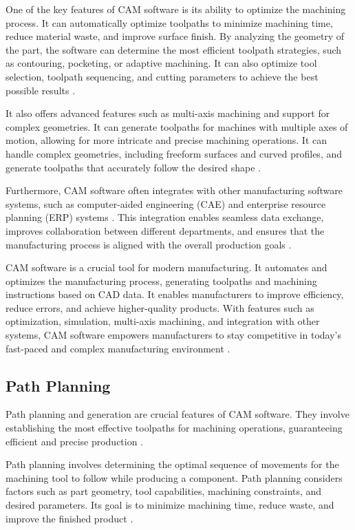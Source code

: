 One of the key features of CAM software is its ability to optimize the machining process. It can automatically optimize toolpaths to minimize machining time, reduce material waste, and improve surface finish. By analyzing the geometry of the part, the software can determine the most efficient toolpath strategies, such as contouring, pocketing, or adaptive machining. It can also optimize tool selection, toolpath sequencing, and cutting parameters to achieve the best possible results \cite{Kyratsis.2020}.

It also offers advanced features such as multi-axis machining and support for complex geometries. It can generate toolpaths for machines with multiple axes of motion, allowing for more intricate and precise machining operations. It can handle complex geometries, including freeform surfaces and curved profiles, and generate toolpaths that accurately follow the desired shape \cite{Liang.2021}.

Furthermore, CAM software often integrates with other manufacturing software systems, such as computer-aided engineering (CAE) and enterprise resource planning (ERP) systems \cite{Ramazanov.2020}. This integration enables seamless data exchange, improves collaboration between different departments, and ensures that the manufacturing process is aligned with the overall production goals \cite{Kadam.2023}.

CAM software is a crucial tool for modern manufacturing. It automates and optimizes the manufacturing process, generating toolpaths and machining instructions based on CAD data. It enables manufacturers to improve efficiency, reduce errors, and achieve higher-quality products. With features such as optimization, simulation, multi-axis machining, and integration with other systems, CAM software empowers manufacturers to stay competitive in today's fast-paced and complex manufacturing environment \cite{Kappmeyer.2021}.


\subsection{Path Planning}
Path planning and generation are crucial features of CAM software. They involve establishing the most effective toolpaths for machining operations, guaranteeing efficient and precise production \cite{Brecher.2013}.

Path planning involves determining the optimal sequence of movements for the machining tool to follow while producing a component. Path planning considers factors such as part geometry, tool capabilities, machining constraints, and desired parameters. Its goal is to minimize machining time, reduce waste, and improve the finished product \cite{Xu.2015}.

